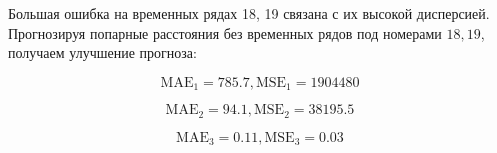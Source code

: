 \documentclass{article}
\begin{document}
Большая ошибка на временных рядах 18, 19 связана с их  высокой дисперсией. Прогнозируя попарные расстояния без временных рядов под номерами $18, 19$, получаем улучшение прогноза:

\begin{equation}
    \text{MAE}_1 = 785.7, \text{MSE}_1 = 1904480
\end{equation}

\begin{equation}
    \text{MAE}_2 = 94.1, \text{MSE}_2 = 38195.5
\end{equation}

\begin{equation}
    \text{MAE}_3 = 0.11, \text{MSE}_3 = 0.03
\end{equation}



\end{document}
